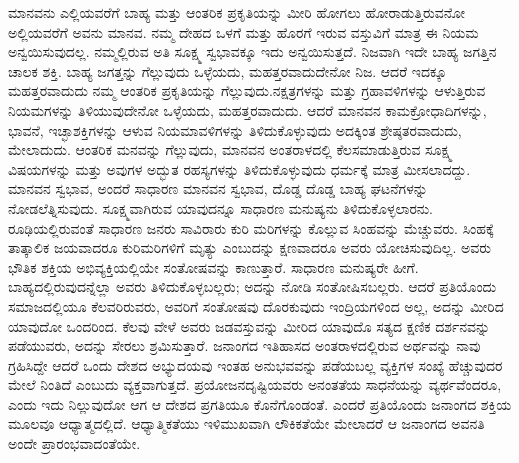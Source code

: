 \vskip  0.2cm

ಮಾನವನು ಎಲ್ಲಿಯವರೆಗೆ ಬಾಹ್ಯ ಮತ್ತು ಆಂತರಿಕ ಪ್ರಕೃತಿಯನ್ನು ಮೀರಿ ಹೋಗಲು ಹೋರಾಡುತ್ತಿರುವನೋ ಅಲ್ಲಿಯವರೆಗೆ ಅವನು ಮಾನವ. ನಮ್ಮ ದೇಹದ ಒಳಗೆ ಮತ್ತು ಹೊರಗೆ ಇರುವ ವಸ್ತುವಿಗೆ ಮಾತ್ರ ಈ ನಿಯಮ ಅನ್ವಯಿಸುವುದಲ್ಲ. ನಮ್ಮಲ್ಲಿರುವ ಅತಿ ಸೂಕ್ಷ್ಮ ಸ್ವಭಾವಕ್ಕೂ ಇದು ಅನ್ವಯಿಸುತ್ತದೆ. ನಿಜವಾಗಿ ಇದೇ ಬಾಹ್ಯ ಜಗತ್ತಿನ ಚಾಲಕ ಶಕ್ತಿ. ಬಾಹ್ಯ ಜಗತ್ತನ್ನು ಗೆಲ್ಲುವುದು ಒಳ್ಳೆಯದು, ಮಹತ್ತರವಾದುದೇನೋ ನಿಜ. ಆದರೆ ಇದಕ್ಕೂ ಮಹತ್ತರವಾದುದು ನಮ್ಮ ಆಂತರಿಕ ಪ್ರಕೃತಿಯನ್ನು ಗೆಲ್ಲುವುದು.\break ನಕ್ಷತ್ರಗಳನ್ನು ಮತ್ತು ಗ್ರಹಾವಳಿಗಳನ್ನು ಆಳುತ್ತಿರುವ ನಿಯಮಗಳನ್ನು ತಿಳಿಯುವುದೇನೋ ಒಳ್ಳೆಯದು, ಮಹತ್ತರವಾದುದು. ಆದರೆ ಮಾನವನ ಕಾಮಕ್ರೋಧಾದಿಗಳನ್ನು, ಭಾವನೆ, ಇಚ್ಛಾಶಕ್ತಿಗಳನ್ನು ಆಳುವ ನಿಯಮಾವಳಿಗಳನ್ನು ತಿಳಿದುಕೊಳ್ಳುವುದು ಅದಕ್ಕಿಂತ ಶ್ರೇಷ್ಠತರವಾದುದು, ಮೇಲಾದುದು. ಆಂತರಿಕ ಮನವನ್ನು ಗೆಲ್ಲುವುದು, ಮಾನವನ ಅಂತರಾಳದಲ್ಲಿ ಕೆಲಸಮಾಡುತ್ತಿರುವ ಸೂಕ್ಷ್ಮ ವಿಷಯಗಳನ್ನು ಮತ್ತು ಅವುಗಳ ಅದ್ಭುತ ರಹಸ್ಯಗಳನ್ನು ತಿಳಿದುಕೊಳ್ಳುವುದು ಧರ್ಮಕ್ಕೆ ಮಾತ್ರ ಮೀಸಲಾದದ್ದು. ಮಾನವನ ಸ್ವಭಾವ, ಅಂದರೆ ಸಾಧಾರಣ ಮಾನವನ ಸ್ವಭಾವ, ದೊಡ್ಡ ದೊಡ್ಡ ಬಾಹ್ಯ ಘಟನೆಗಳನ್ನು ನೋಡಲೆತ್ನಿಸುವುದು. ಸೂಕ್ಷ್ಮವಾಗಿರುವ ಯಾವುದನ್ನೂ ಸಾಧಾರಣ ಮನುಷ್ಯನು ತಿಳಿದುಕೊಳ್ಳಲಾರನು. ರೂಢಿಯಲ್ಲಿರುವಂತೆ ಸಾಧಾರಣ ಜನರು ಸಾವಿರಾರು ಕುರಿ ಮರಿಗಳನ್ನು ಕೊಲ್ಲುವ ಸಿಂಹವನ್ನು ಮೆಚ್ಚುವರು. ಸಿಂಹಕ್ಕೆ ತಾತ್ಕಾಲಿಕ ಜಯವಾದರೂ ಕುರಿಮರಿಗಳಿಗೆ ಮೃತ್ಯು ಎಂಬುದನ್ನು ಕ್ಷಣವಾದರೂ ಅವರು ಯೋಚಿಸುವುದಿಲ್ಲ. ಅವರು ಭೌತಿಕ ಶಕ್ತಿಯ ಅಭಿವ್ಯಕ್ತಿಯಲ್ಲಿಯೇ ಸಂತೋಷವನ್ನು ಕಾಣುತ್ತಾರೆ. ಸಾಧಾರಣ ಮನುಷ್ಯರೇ ಹೀಗೆ. ಬಾಹ್ಯದಲ್ಲಿರುವುದನ್ನೆಲ್ಲಾ ಅವರು ತಿಳಿದುಕೊಳ್ಳಬಲ್ಲರು; ಅದನ್ನು ನೋಡಿ ಸಂತೋಷಿಸಬಲ್ಲರು. ಆದರೆ ಪ್ರತಿಯೊಂದು ಸಮಾಜದಲ್ಲಿಯೂ ಕೆಲವರಿರುವರು, ಅವರಿಗೆ ಸಂತೋಷವು ದೊರಕುವುದು ಇಂದ್ರಿಯಗಳಿಂದ ಅಲ್ಲ, ಅದನ್ನು ಮೀರಿದ ಯಾವುದೋ ಒಂದರಿಂದ. ಕೆಲವು ವೇಳೆ ಅವರು ಜಡವಸ್ತುವನ್ನು ಮೀರಿದ ಯಾವುದೊ ಸತ್ಯದ ಕ್ಷಣಿಕ ದರ್ಶನವನ್ನು ಪಡೆಯುವರು, ಅದನ್ನು ಸೇರಲು ಶ್ರಮಿಸುತ್ತಾರೆ. ಜನಾಂಗದ ಇತಿಹಾಸದ ಅಂತರಾಳದಲ್ಲಿರುವ ಅರ್ಥವನ್ನು ನಾವು ಗ್ರಹಿಸಿದ್ದೇ ಆದರೆ ಒಂದು ದೇಶದ ಅಭ್ಯುದಯವು ಇಂತಹ ಅನುಭವವನ್ನು ಪಡೆಯಬಲ್ಲ ವ್ಯಕ್ತಿಗಳ ಸಂಖ್ಯೆ ಹೆಚ್ಚುವುದರ ಮೇಲೆ ನಿಂತಿದೆ ಎಂಬುದು ವ್ಯಕ್ತವಾಗುತ್ತದೆ. ಪ್ರಯೋಜನದೃಷ್ಟಿಯವರು ಅನಂತತೆಯ ಸಾಧನೆಯನ್ನು ವ್ಯರ್ಥವೆಂದರೂ, ಎಂದು ಇದು ನಿಲ್ಲುವುದೋ ಆಗ ಆ ದೇಶದ ಪ್ರಗತಿಯೂ ಕೊನೆಗೊಂಡಂತೆ. ಎಂದರೆ ಪ್ರತಿಯೊಂದು ಜನಾಂಗದ ಶಕ್ತಿಯ ಮೂಲವೂ ಆಧ್ಯಾತ್ಮದಲ್ಲಿದೆ. ಆಧ್ಯಾತ್ಮಿಕತೆಯು ಇಳಿಮುಖವಾಗಿ ಲೌಕಿಕತೆಯೇ ಮೇಲಾದರೆ ಆ ಜನಾಂಗದ ಅವನತಿ ಅಂದೇ ಪ್ರಾರಂಭವಾದಂತೆಯೇ.

